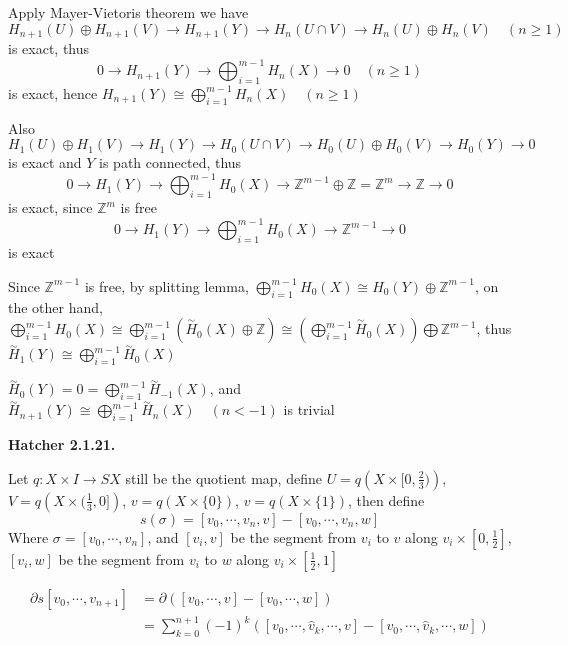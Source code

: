 \documentclass[12pt]{article}
\begin{document}
Apply Mayer-Vietoris theorem we have
\[
H_{n+1}(U)\oplus H_{n+1}(V)\rightarrow H_{n+1}(Y)\rightarrow H_n(U\cap V)\rightarrow H_n(U)\oplus H_n(V) \quad (n\geq 1)
\]
is exact, thus
\[
0\rightarrow H_{n+1}(Y)\rightarrow \bigoplus_{i=1}^{m-1}H_n(X)\rightarrow 0 \quad (n\geq 1)
\]
is exact, hence $H_{n+1}(Y)\cong\bigoplus_{i=1}^{m-1}H_n(X)\quad (n\geq 1)$ \par
Also
\[
H_1(U)\oplus H_1(V)\rightarrow H_1(Y)\rightarrow H_0(U\cap V)\rightarrow H_0(U)\oplus H_0(V)\rightarrow H_0(Y)\rightarrow 0
\]
is exact and $Y$ is path connected, thus
\[
0\rightarrow H_1(Y)\rightarrow \bigoplus_{i=1}^{m-1}H_0(X)\rightarrow \mathbb{Z}^{m-1}\oplus\mathbb{Z}=\mathbb{Z}^m\rightarrow \mathbb{Z}\rightarrow 0
\]
is exact, since $\mathbb{Z}^m$ is free
\[
0\rightarrow H_1(Y)\rightarrow \bigoplus_{i=1}^{m-1}H_0(X)\rightarrow \mathbb{Z}^{m-1}\rightarrow 0
\]
is exact \par
Since $\mathbb{Z}^{m-1}$ is free, by splitting lemma, $\displaystyle\bigoplus_{i=1}^{m-1}H_0(X)\cong H_0(Y)\oplus\mathbb{Z}^{m-1}$, on the other hand, $\displaystyle\bigoplus_{i=1}^{m-1}H_0(X)\cong\bigoplus_{i=1}^{m-1}\left(\overset{\sim}{H}_0(X)\oplus\mathbb{Z}\right)\cong\left(\bigoplus_{i=1}^{m-1}\overset{\sim}{H}_0(X)\right)\bigoplus\mathbb{Z}^{m-1}$, thus $\displaystyle\overset{\sim}{H}_1(Y)\cong\bigoplus_{i=1}^{m-1}\overset{\sim}{H}_0(X)$ \par
$\displaystyle\overset{\sim}{H}_0(Y)=0=\bigoplus_{i=1}^{m-1}\overset{\sim}{H}_{-1}(X)$, and $\displaystyle\overset{\sim}{H}_{n+1}(Y)\cong\bigoplus_{i=1}^{m-1}\overset{\sim}{H}_n(X)\quad (n<-1)$ is trivial \par
\textbf{Hatcher 2.1.21.} \par
Let $q:X\times I\rightarrow SX$ still be the quotient map, define $U=q\left(X\times[0,\frac{2}{3})\right)$, $V=q\left(X\times(\frac{1}{3},0]\right)$, $v=q\left(X\times\{0\}\right)$, $v=q\left(X\times\{1\}\right)$, then define
$$s(\sigma)=[v_0,\cdots,v_n,v]-[v_0,\cdots,v_n,w]$$
Where $\sigma=[v_0,\cdots,v_n]$, and $[v_i,v]$ be the segment from $v_i$ to $v$ along $v_i\times\left[0,\frac{1}{2}\right]$, $[v_i,w]$ be the segment from $v_i$ to $w$ along $v_i\times\left[\frac{1}{2},1\right]$ \par
\[
\begin{aligned}
\partial s[v_0,\cdots,v_{n+1}]
&=\partial\left([v_0,\cdots,v]-[v_0,\cdots,w]\right) \\
&=\sum_{k=0}^{n+1}(-1)^k\left([v_0,\cdots,\hat{v}_k,\cdots,v]-[v_0,\cdots,\hat{v}_k,\cdots,w]\right)
\end{aligned}
\]
\end{document}
